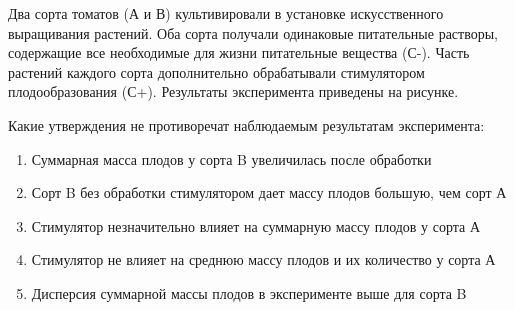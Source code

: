 
Два сорта томатов (А и В) культивировали в
установке искусственного выращивания растений. Оба сорта получали одинаковые
питательные растворы, содержащие все необходимые для жизни питательные вещества
(С-). Часть растений каждого сорта дополнительно обрабатывали стимулятором
плодообразования (С+). Результаты эксперимента приведены на рисунке.


Какие утверждения не противоречат
наблюдаемым результатам эксперимента:

\begin{enumerate}
    \item Суммарная масса плодов у сорта B увеличилась после обработки
    \item Сорт B без обработки стимулятором дает массу плодов большую, чем сорт А
    \item Стимулятор незначительно влияет на суммарную массу плодов у сорта А
    \item Стимулятор не влияет на среднюю массу плодов и их количество у сорта А
    \item Дисперсия суммарной массы плодов в эксперименте выше для сорта B
\end{enumerate}

\explanationSection

